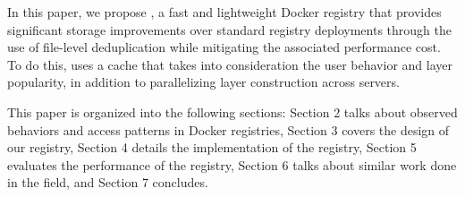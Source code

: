 In this paper, we propose \sysname, a fast and lightweight Docker registry that provides significant storage improvements over standard registry deployments through the use of file-level deduplication while mitigating the associated performance cost. To do this, \sysname uses a cache that takes into consideration the user behavior and layer popularity, in addition to parallelizing layer construction across %
servers.

This paper is organized into the following sections: Section 2 talks about observed behaviors and access patterns in Docker registries, Section 3 covers the design of our registry, Section 4 details the implementation of the registry, Section 5 evaluates the performance of the registry, Section 6 talks about similar work done in the field, and Section 7 concludes. 

  
